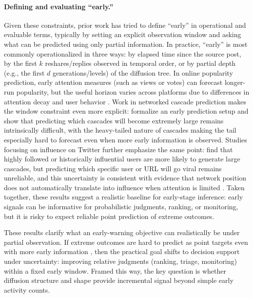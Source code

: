 \paragraph{Defining and evaluating ``early.''}
Given these constraints, prior work has tried to define ``early'' in operational and evaluable terms, typically by setting an explicit observation window and asking what can be predicted using only partial information. In practice, ``early'' is most commonly operationalized in three ways: by elapsed time since the source post, by the first $k$ reshares/replies observed in temporal order, or by partial depth (e.g., the first $d$ generations/levels) of the diffusion tree. In online popularity prediction, early attention measures (such as views or votes) can forecast longer-run popularity, but the useful horizon varies across platforms due to differences in attention decay and user behavior \citep{szabo_predicting_2010}. Work in networked cascade prediction makes the window constraint even more explicit: \citet{cheng_can_2014} formalize an early prediction setup and show that predicting which cascades will become extremely large remains intrinsically difficult, with the heavy-tailed nature of cascades making the tail especially hard to forecast even when more early information is observed. Studies focusing on influence on Twitter further emphasize the same point: \citet{bakshy_everyones_2011} find that highly followed or historically influential users are more likely to generate large cascades, but predicting which specific user or URL will go viral remains unreliable, and this uncertainty is consistent with evidence that network position does not automatically translate into influence when attention is limited \citep{lerman_information_2010}. Taken together, these results suggest a realistic baseline for early-stage inference: early signals can be informative for probabilistic judgments, ranking, or monitoring, but it is risky to expect reliable point prediction of extreme outcomes.


These results clarify what an early-warning objective can realistically be under partial observation. If extreme outcomes are hard to predict as point targets even with more early information \citep{cheng_can_2014}, then the practical goal shifts to decision support under uncertainty: improving relative judgments (ranking, triage, monitoring) within a fixed early window. Framed this way, the key question is whether diffusion structure and shape provide incremental signal beyond simple early activity counts.


